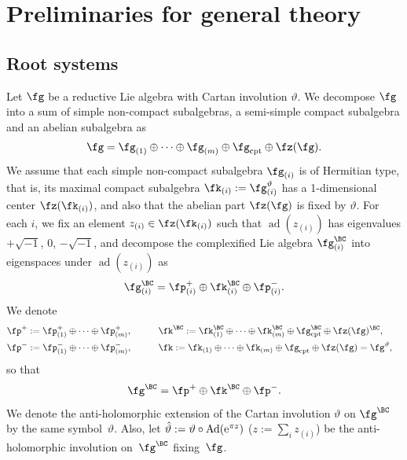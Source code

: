 \section{Preliminaries for general theory}\label{section2}
\subsection{Root systems}\label{root_sys}
Let $\fg$ be a reductive Lie algebra with Cartan involution $\vartheta$. We decompose $\fg$ into a sum of simple non-compact subalgebras, a semi-simple compact subalgebra and an abelian subalgebra as
\begin{gather*} \fg=\fg_{(1)}\oplus\cdots\oplus\fg_{(m)}\oplus\fg_{\text{cpt}}\oplus\fz(\fg). \end{gather*}
We assume that each simple non-compact subalgebra $\fg_{(i)}$ is of Hermitian type, that is,
its maximal compact subalgebra $\fk_{(i)}:=\fg^\vartheta_{(i)}$ has a 1-dimensional center $\fz(\fk_{(i)})$, and also that the abelian part $\fz(\fg)$ is fixed by $\vartheta$. For each $i$, we fix an element $z_{(i)}\in\fz(\fk_{(i)})$ such that $\operatorname{ad}(z_{(i)})$ has eigenvalues $+\sqrt{-1}$, $0$, $-\sqrt{-1}$,
and decompose the complexified Lie algebra $\fg_{(i)}^\BC$ into eigenspaces under $\operatorname{ad}(z_{(i)})$ as
\begin{gather*} \fg_{(i)}^\BC=\fp^+_{(i)}\oplus \fk^\BC_{(i)}\oplus\fp^-_{(i)}. \end{gather*}
We denote
\begin{alignat*}{3}
& \fp^+ :=\fp^+_{(1)}\oplus\cdots\oplus\fp^+_{(m)},\qquad && \fk^\BC:=\fk_{(1)}^\BC\oplus\cdots\oplus\fk_{(m)}^\BC\oplus\fg_{\text{cpt}}^\BC\oplus\fz(\fg)^\BC,&\\
&\fp^-:=\fp^-_{(1)}\oplus\cdots\oplus\fp^-_{(m)},\qquad && \fk :=\fk_{(1)}\oplus\cdots\oplus\fk_{(m)}\oplus\fg_{\text{cpt}}\oplus\fz(\fg)=\fg^\vartheta,&
\end{alignat*}
so that
\begin{gather*} \fg^\BC=\fp^+\oplus\fk^\BC\oplus\fp^-. \end{gather*}
We denote the anti-holomorphic extension of the Cartan involution $\vartheta$ on $\fg^\BC$ by the same sym\-bol~$\vartheta$.
Also, let $\hat{\vartheta}:=\vartheta\circ \operatorname{Ad}({\rm e}^{\pi z})$ ($z:=\sum_i{z_{(i)}}$) be the anti-holomorphic involution on~$\fg^\BC$ fixing~$\fg$.

